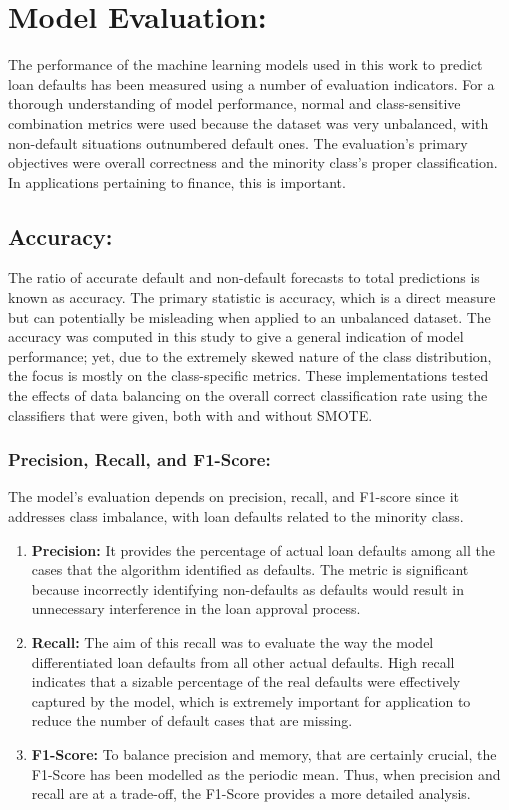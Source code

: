 \documentclass[12pt, a4paper,oneside]{book}
\numberwithin{equation}{section}
\begin{document}
\section{Model Evaluation:}
The performance of the machine learning models used in this work to predict loan defaults has been measured using a number of evaluation indicators. For a thorough understanding of model performance, normal and class-sensitive combination metrics were used because the dataset was very unbalanced, with non-default situations outnumbered default ones. The evaluation's primary objectives were overall correctness and the minority class's proper classification. In applications pertaining to finance, this is important.

\subsection{Accuracy:}
The ratio of accurate default and non-default forecasts to total predictions is known as accuracy. The primary statistic is accuracy, which is a direct measure but can potentially be misleading when applied to an unbalanced dataset. The accuracy was computed in this study to give a general indication of model performance; yet, due to the extremely skewed nature of the class distribution, the focus is mostly on the class-specific metrics.
These implementations tested the effects of data balancing on the overall correct classification rate using the classifiers that were given, both with and without SMOTE.

\subsubsection{Precision, Recall, and F1-Score:}
The model's evaluation depends on precision, recall, and F1-score since it addresses class imbalance, with loan defaults related to the minority class.

\begin{enumerate}
    \item\textbf{Precision:} \newline
     It provides the percentage of actual loan defaults among all the cases that the algorithm identified as defaults. The metric is significant because incorrectly identifying non-defaults as defaults would result in unnecessary interference in the loan approval process.

    \item\textbf{Recall:} \newline
    The aim of this recall was to evaluate the way the model differentiated loan defaults from all other actual defaults. High recall indicates that a sizable percentage of the real defaults were effectively captured by the model, which is extremely important for application to reduce the number of default cases that are missing.

    \item\textbf{F1-Score:} \newline
    To balance precision and memory, that are certainly crucial, the F1-Score has been modelled as the periodic mean. Thus, when precision and recall are at a trade-off, the F1-Score provides a more detailed analysis.
\end{enumerate}
\end{document}
